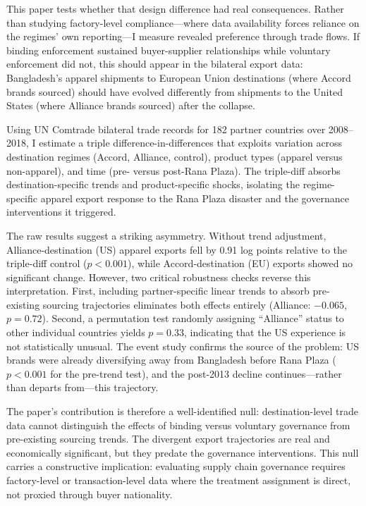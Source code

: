 \documentclass[12pt]{article}
\begin{document}
This paper tests whether that design difference had real consequences. Rather than studying factory-level compliance---where data availability forces reliance on the regimes' own reporting---I measure revealed preference through trade flows. If binding enforcement sustained buyer-supplier relationships while voluntary enforcement did not, this should appear in the bilateral export data: Bangladesh's apparel shipments to European Union destinations (where Accord brands sourced) should have evolved differently from shipments to the United States (where Alliance brands sourced) after the collapse.

Using UN Comtrade bilateral trade records for 182 partner countries over 2008--2018, I estimate a triple difference-in-differences that exploits variation across destination regimes (Accord, Alliance, control), product types (apparel versus non-apparel), and time (pre- versus post-Rana Plaza). The triple-diff absorbs destination-specific trends and product-specific shocks, isolating the regime-specific apparel export response to the Rana Plaza disaster and the governance interventions it triggered.

The raw results suggest a striking asymmetry. Without trend adjustment, Alliance-destination (US) apparel exports fell by 0.91 log points relative to the triple-diff control ($p < 0.001$), while Accord-destination (EU) exports showed no significant change. However, two critical robustness checks reverse this interpretation. First, including partner-specific linear trends to absorb pre-existing sourcing trajectories eliminates both effects entirely (Alliance: $-0.065$, $p = 0.72$). Second, a permutation test randomly assigning ``Alliance'' status to other individual countries yields $p = 0.33$, indicating that the US experience is not statistically unusual. The event study confirms the source of the problem: US brands were already diversifying away from Bangladesh before Rana Plaza ($p < 0.001$ for the pre-trend test), and the post-2013 decline continues---rather than departs from---this trajectory.

The paper's contribution is therefore a well-identified null: destination-level trade data cannot distinguish the effects of binding versus voluntary governance from pre-existing sourcing trends. The divergent export trajectories are real and economically significant, but they predate the governance interventions. This null carries a constructive implication: evaluating supply chain governance requires factory-level or transaction-level data where the treatment assignment is direct, not proxied through buyer nationality.
\end{document}
